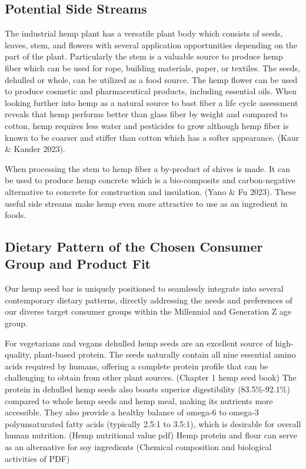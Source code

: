 \subsection{Potential Side Streams}
The industrial hemp plant has a versatile plant body which consists of seeds, leaves, stem, and flowers with several application opportunities depending on the part of the plant. Particularly the stem is a valuable source to produce hemp fiber which can be used for rope, building materials, paper, or textiles. The seeds, dehulled or whole, can be utilized as a food source. The hemp flower can be used to produce cosmetic and pharmaceutical products, including essential oils. When looking further into hemp as a natural source to bast fiber a life cycle assessment reveals that hemp performs better than glass fiber by weight and compared to cotton, hemp requires less water and pesticides to grow although hemp fiber is known to be coarser and stiffer than cotton which has a softer appearance. (Kaur \& Kander 2023). 

\vspace{1em}
When processing the stem to hemp fiber a by-product of shives is made. It can be used to produce hemp concrete which is a bio-composite and carbon-negative alternative to concrete for construction and insulation. (Yano \& Fu 2023). These useful side streams make hemp even more attractive to use as an ingredient in foods. 

\subsection{Dietary Pattern of the Chosen Consumer Group and Product Fit}
Our hemp seed bar is uniquely positioned to seamlessly integrate into several contemporary dietary patterns, directly addressing the needs and preferences of our diverse target consumer groups within the Millennial and Generation Z age group.

\vspace{1em}
For vegetarians and vegans dehulled hemp seeds are an excellent source of high-quality, plant-based protein. The seeds naturally contain all nine essential amino acids required by humans, offering a complete protein profile that can be challenging to obtain from other plant sources. (Chapter 1 hemp seed book) The protein in dehulled hemp seeds also boasts superior digestibility (83.5\%-92.1\%) compared to whole hemp seeds and hemp meal, making its nutrients more accessible. They also provide a healthy balance of omega-6 to omega-3 polyunsaturated fatty acids (typically 2.5:1 to 3.5:1), which is desirable for overall human nutrition. (Hemp nutritional value pdf) Hemp protein and flour can serve as an alternative for soy ingredients (Chemical composition and biological activities of PDF) 

